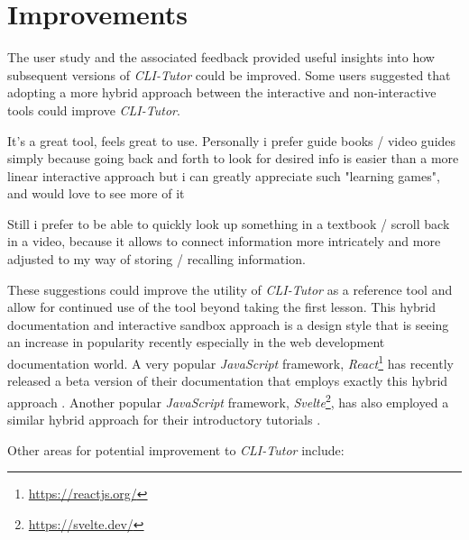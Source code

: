 \section{Improvements}

The user study and the associated feedback provided useful insights into how subsequent versions of \textit{CLI-Tutor} could be improved. Some users suggested that adopting a more hybrid approach between the interactive and non-interactive tools could improve \textit{CLI-Tutor}.

\begin{quotes}
	It's a great tool, feels great to use. Personally i prefer guide books / video guides simply
	because going back and forth to look for desired info is easier than a more linear interactive
	approach but i can greatly appreciate such "learning games", and would love to see more of it
\end{quotes}

\begin{quotes}
	Still i prefer to be able to quickly look up something in a textbook / scroll back in a video,
	because it allows to connect information more intricately and more adjusted to my way of
	storing / recalling information.
\end{quotes}

These suggestions could improve the utility of \textit{CLI-Tutor} as a
reference tool and allow for continued use of the tool beyond taking the first
lesson. This hybrid documentation and interactive sandbox approach is a design
style that is seeing an increase in popularity recently especially in the web
development documentation world. A very popular  \textit{JavaScript} framework,
\textit{React}\footnote{\url{https://reactjs.org/}} has recently released a
beta version of their documentation that employs exactly this hybrid approach
\cite{team_meta}. Another popular \textit{JavaScript} framework,
\textit{Svelte}\footnote{\url{https://svelte.dev/}}, has also employed a similar
hybrid approach for their introductory tutorials \cite{harris_team}.


Other areas for potential improvement to \textit{CLI-Tutor} include:

